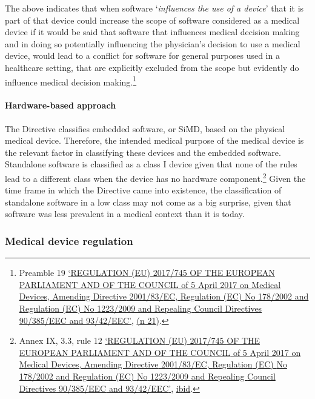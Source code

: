 \documentclass[
]{scrartcl}
\begin{document}
The above indicates that when software `\emph{influences the use of a device}' that it is part of that device could increase the scope of software considered as a medical device if it would be said that software that influences medical decision making and in doing so potentially influencing the physician's decision to use a medical device, would lead to a conflict for software for general purposes used in a healthcare setting, that are explicitly excluded from the scope but evidently do influence medical decision making.\footnote{Preamble 19 \protect\hyperlink{ref-REGULATIONEU2017a}{{`{REGULATION} ({EU}) 2017/745 {OF THE EUROPEAN PARLIAMENT AND OF THE COUNCIL} of 5 {April} 2017 on Medical Devices, Amending {Directive} 2001/83/{EC}, {Regulation} ({EC}) {No} 178/2002 and {Regulation} ({EC}) {No} 1223/2009 and Repealing {Council Directives} 90/385/{EEC} and 93/42/{EEC}'}}, \protect\hyperlink{ref-REGULATIONEU2017a}{(n 21)}.}

\hypertarget{hardware-based-approach}{%
\paragraph{Hardware-based approach}\label{hardware-based-approach}}

The Directive classifies embedded software, or SiMD, based on the physical medical device. Therefore, the intended medical purpose of the medical device is the relevant factor in classifying these devices and the embedded software. Standalone software is classified as a class I device given that none of the rules lead to a different class when the device has no hardware component.\footnote{Annex IX, 3.3, rule 12 \protect\hyperlink{ref-REGULATIONEU2017a}{{`{REGULATION} ({EU}) 2017/745 {OF THE EUROPEAN PARLIAMENT AND OF THE COUNCIL} of 5 {April} 2017 on Medical Devices, Amending {Directive} 2001/83/{EC}, {Regulation} ({EC}) {No} 178/2002 and {Regulation} ({EC}) {No} 1223/2009 and Repealing {Council Directives} 90/385/{EEC} and 93/42/{EEC}'}}, \protect\hyperlink{ref-REGULATIONEU2017a}{ibid}.} Given the time frame in which the Directive came into existence, the classification of standalone software in a low class may not come as a big surprise, given that software was less prevalent in a medical context than it is today.

\hypertarget{medical-device-regulation}{%
\subsubsection{Medical device regulation}\label{medical-device-regulation}}
\end{document}
